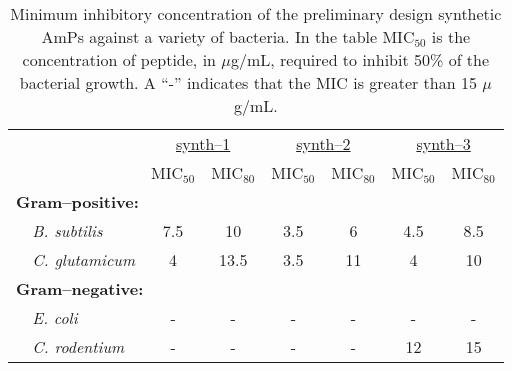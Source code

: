 
\begin{table}[ptbh]
    \caption[Minimum inhibitory concentration of the preliminary design synthetic AmPs against a variety of bacteria]{Minimum inhibitory concentration of the preliminary design synthetic AmPs against a variety of bacteria.
	In the table MIC$_{50}$ is the concentration of peptide, in
	$\mu$g/mL, required to inhibit 50\% of the bacterial growth.
	A ``-'' indicates that the MIC is greater than 15 $\mu$g/mL.
	   }\label{table:mic}
    \begin{center}
    \footnotesize

    \begin{tabular}{lcccccc}%
	& \multicolumn{2}{c}{ \underline{synth--1} }	
	& \multicolumn{2}{c}{ \underline{synth--2} }	
	& \multicolumn{2}{c}{ \underline{synth--3} }	\\
	& \scriptsize MIC$_{50}$ & \scriptsize MIC$_{80}$
	& \scriptsize MIC$_{50}$ & \scriptsize MIC$_{80}$
	& \scriptsize MIC$_{50}$ & \scriptsize MIC$_{80}$ \\ %
	\multicolumn{2}{l}{\bfseries Gram--positive:}\\
	\emph{~~B. subtilis}
	& 7.5
	& 10
	& 3.5
	& 6
	& 4.5
	& 8.5\\
	\emph{~~C. glutamicum}
	& 4
	& 13.5
	& 3.5
	& 11
	& 4
	& 10\\ 
	\multicolumn{2}{l}{\bfseries Gram--negative:}\\
	\emph{~~E. coli}
	& -
	& -
	& -
	& -
	& -
	& -\\ 
	\emph{~~C. rodentium}
	& -
	& -
	& -
	& -
	& 12
	& 15\\ 
    \end{tabular}
    \end{center}

\end{table}
